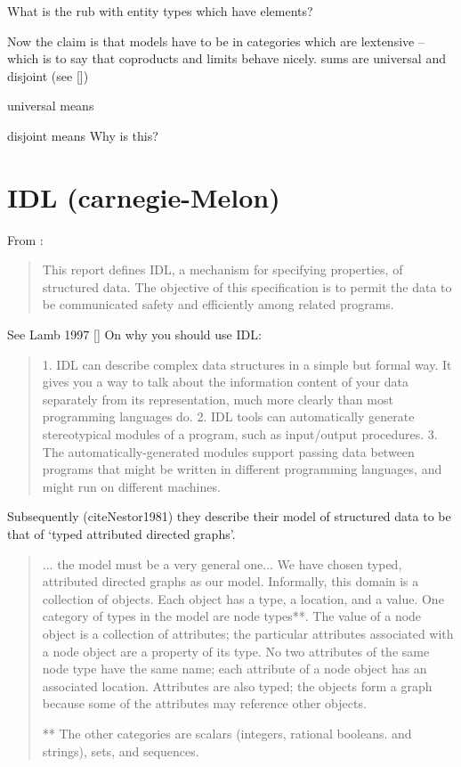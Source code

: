 \documentclass[11pt,a4paper]{scrartcl}
\begin{document}
What is the rub with entity types which have elements?

Now the claim is that models have to be in categories which are lextensive -- which is to say
that coproducts and limits behave nicely. sums are universal and disjoint (see [\cite {Carboni1993}])

universal means

disjoint means 
Why is this?

\section{IDL (carnegie-Melon)}

From \cite{Nestor1981}:

\begin{quote}
This report defines IDL, a mechanism for specifying properties, of structured data. The objective of this
specification is to permit the data to be communicated safety and efficiently among related programs.
\end{quote}

See Lamb 1997 [\cite{Lamb1997}]
On why you should use IDL:
\begin{quote}
1. IDL can describe complex data structures in a simple but formal way.
It gives you a way to talk about the information content of your data
separately from its representation, much more clearly than most programming 
languages do.
2. IDL tools can automatically generate stereotypical modules of a program,
such as input/output procedures.
3. The automatically-generated modules support passing data between programs 
that might be written in different programming languages, and
might run on different machines.
\end{quote}

Subsequently (cite{Nestor1981}) they describe their model of structured data to be that of `typed attributed directed graphs'. 

\begin{quote}
... the
model must be a very general one... We have
chosen typed, attributed directed graphs as our model. Informally, this domain is a collection of objects.
Each object has a type, a location, and a value. One category of types in the model are node types**. The value
of a node object is a collection of attributes; the particular attributes associated with a node object are a
property of its type. No two attributes of the same node type have the same name; each attribute of a node
object has an associated location. Attributes are also typed; the objects form a graph because some of the
attributes may reference other objects.

** The other categories are scalars (integers, rational booleans. and strings), sets, and sequences.
\end{quote}
\end{document}
